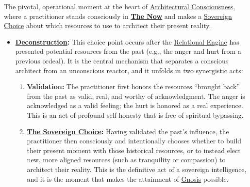 \item[\hypertarget{gloss:sovereign_choice_point}{Sovereign Choice Point}] 
    The pivotal, operational moment at the heart of \hyperlink{gloss:architectural_consciousness}{Architectural Consciousness}, where a practitioner stands consciously in \textbf{\hyperlink{gloss:the_now}{The Now}} and makes a \hyperlink{gloss:sovereign_choice}{Sovereign Choice} about which resources to use to architect their present reality.
    \begin{itemize}
        \item \textbf{\hyperlink{gloss:deconstruction}{Deconstruction}:} This choice point occurs after the \hyperlink{gloss:relational_engine}{Relational Engine} has presented potential resources from the past (e.g., the anger and hurt from a previous ordeal). It is the central mechanism that separates a conscious architect from an unconscious reactor, and it unfolds in two synergistic acts:
        \begin{enumerate}
            \item \textbf{Validation:} The practitioner first honors the resources ``brought back'' from the past as valid, real, and worthy of acknowledgment. The anger is acknowledged as a valid feeling; the hurt is honored as a real experience. This is an act of profound self-honesty that is free of spiritual bypassing.
            
            \item \textbf{\hyperlink{gloss:sovereign_choice}{The Sovereign Choice}:} Having validated the past's influence, the practitioner then consciously and intentionally chooses whether to build their present moment with those historical resources, or to instead elect new, more aligned resources (such as tranquility or compassion) to architect their reality. This is the definitive act of a sovereign intelligence, and it is the moment that makes the attainment of \hyperlink{gloss:gnosis}{Gnosis} possible.
        \end{enumerate}
    \end{itemize}

